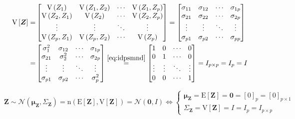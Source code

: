 \documentclass[
]{book}
\theoremstyle{definition}
\theoremstyle{definition}
\theoremstyle{definition}
\theoremstyle{definition}
\theoremstyle{remark}
\begin{document}
\[
\begin{aligned}
\mathrm{V}\left[\boldsymbol{Z}\right]= & \begin{bmatrix}\mathrm{V}\left(Z_{1}\right) & \mathrm{V}\left(Z_{1},Z_{2}\right) & \cdots & \mathrm{V}\left(Z_{1},Z_{p}\right)\\
\mathrm{V}\left(Z_{2},Z_{1}\right) & \mathrm{V}\left(Z_{2}\right) & \cdots & \mathrm{V}\left(Z_{2},Z_{p}\right)\\
\vdots & \vdots & \ddots & \vdots\\
\mathrm{V}\left(Z_{p},Z_{1}\right) & \mathrm{V}\left(Z_{p},Z_{2}\right) & \cdots & \mathrm{V}\left(Z_{p}\right)
\end{bmatrix}=\begin{bmatrix}\sigma_{11} & \sigma_{12} & \cdots & \sigma_{1p}\\
\sigma_{21} & \sigma_{22} & \cdots & \sigma_{2p}\\
\vdots & \vdots & \ddots & \vdots\\
\sigma_{p1} & \sigma_{p2} & \cdots & \sigma_{pp}
\end{bmatrix}\\
= & \begin{bmatrix}\sigma_{1}^{2} & \sigma_{12} & \cdots & \sigma_{1p}\\
\sigma_{21} & \sigma_{2}^{2} & \cdots & \sigma_{2p}\\
\vdots & \vdots & \ddots & \vdots\\
\sigma_{p1} & \sigma_{p2} & \cdots & \sigma_{p}^{2}
\end{bmatrix}\overset{\ref{eq:idpsmnd}}{=}\begin{bmatrix}1 & 0 & \cdots & 0\\
0 & 1 & \cdots & 0\\
\vdots & \vdots & \ddots & \vdots\\
0 & 0 & \cdots & 1
\end{bmatrix}=I_{p\times p}=I_{p}=I
\end{aligned}
\]

\[
\boldsymbol{Z}\sim\mathcal{N}\left(\boldsymbol{\mu}_{\boldsymbol{Z}},\mathit{\Sigma}_{\boldsymbol{Z}}\right)=\mathrm{n}\left(\mathrm{E}\left[\boldsymbol{Z}\right],\mathrm{V}\left[\boldsymbol{Z}\right]\right)=\mathcal{N}\left(\boldsymbol{0},I\right)\Leftrightarrow\begin{cases}
\boldsymbol{\mu}_{\boldsymbol{Z}}=\mathrm{E}\left[\boldsymbol{Z}\right]=\boldsymbol{0}=\left[0\right]_{p}=\left[0\right]_{p\times1}\\
\mathit{\Sigma}_{\boldsymbol{Z}}=\mathrm{V}\left[\boldsymbol{Z}\right]=I=I_{p}=I_{p\times p}
\end{cases}
\]
\end{document}
